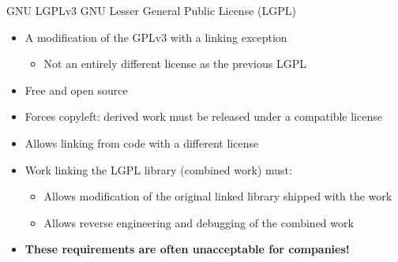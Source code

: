 \documentclass[presentation]{beamer}
\begin{document}
\begin{frame}{GNU LGPLv3}
    GNU Lesser General Public License (LGPL) 
    \begin{itemize}
        \item A modification of the GPLv3 with a linking exception
        \begin{itemize}
            \item Not an entirely different license as the previous LGPL
        \end{itemize}
        \item Free and open source
        \item Forces copyleft: derived work must be released under a compatible license
        \item Allows linking from code with a different license
        \item Work linking the LGPL library (combined work) must:
        \begin{itemize}
            \item Allows modification of the original linked library shipped with the work
            \item Allows reverse engineering and debugging of the combined work
        \end{itemize}
        \item \textbf{These requirements are often unacceptable for companies!}
    \end{itemize}
\end{frame}
\end{document}

